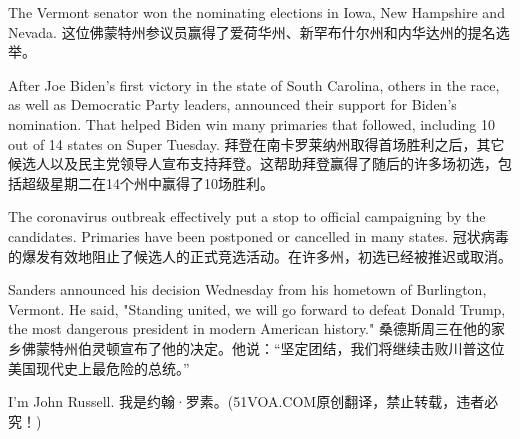 The Vermont senator won the nominating elections in Iowa, New Hampshire and Nevada.
这位佛蒙特州参议员赢得了爱荷华州、新罕布什尔州和内华达州的提名选举。

After Joe Biden's first victory in the state of South Carolina, others in the race, as well as Democratic Party leaders, announced their support for Biden's nomination. That helped Biden win many primaries that followed, including 10 out of 14 states on Super Tuesday.
拜登在南卡罗莱纳州取得首场胜利之后，其它候选人以及民主党领导人宣布支持拜登。这帮助拜登赢得了随后的许多场初选，包括超级星期二在14个州中赢得了10场胜利。

The coronavirus outbreak effectively put a stop to official campaigning by the candidates. Primaries have been postponed or cancelled in many states.
冠状病毒的爆发有效地阻止了候选人的正式竞选活动。在许多州，初选已经被推迟或取消。

Sanders announced his decision Wednesday from his hometown of Burlington, Vermont. He said, "Standing united, we will go forward to defeat Donald Trump, the most dangerous president in modern American history."
桑德斯周三在他的家乡佛蒙特州伯灵顿宣布了他的决定。他说：“坚定团结，我们将继续击败川普这位美国现代史上最危险的总统。”

I'm John Russell.
我是约翰·罗素。(51VOA.COM原创翻译，禁止转载，违者必究！)

